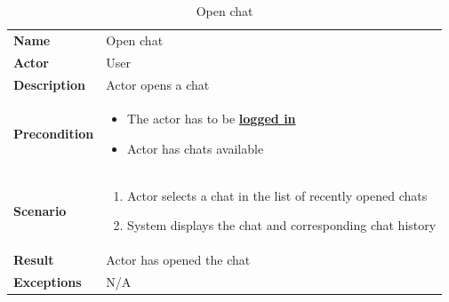 \begin{table}[ht]
    \caption{Open chat}
    \begin{tabular}{|L{5cm}|L{10cm}|}
        \toprule
        \textbf{Name}        & Open chat                 \\
        \textbf{Actor}       & User                      \\
        \textbf{Description} & Actor opens a chat        \\
        \textbf{Precondition} &
        \vspace{-0.75cm}
        \begin{itemize}
            \setlength\itemsep{-0.5em}
            \item The actor has to be \textbf{\hyperref[tab:table8]{logged in}}
            \item Actor has chats available
        \end{itemize} \\[-0.5cm]
        \textbf{Scenario} &
        \vspace{-0.75cm}
        \begin{enumerate}
            \setlength\itemsep{-0.5em}
            \item Actor selects a chat in the list of recently opened chats
            \item System displays the chat and corresponding chat history
        \end{enumerate} \\[-0.5cm]
        \textbf{Result}      & Actor has opened the chat \\
        \textbf{Exceptions}  & N/A                       \\
        \bottomrule
    \end{tabular}
    \label{tab:table16}
\end{table}

